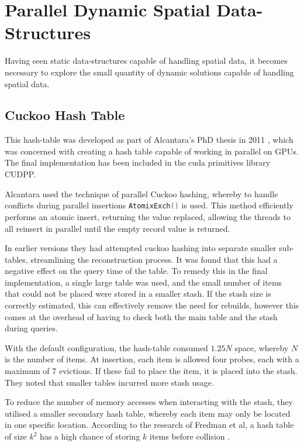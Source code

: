 \section{Parallel Dynamic Spatial Data-Structures\label{sec:parallel-dynamic-spatial}}
    
    Having seen static data-structures capable of handling spatial data, it becomes necessary to explore the small quantity of dynamic solutions capable of handling spatial data.
        
    \subsection{ Cuckoo Hash Table}
      This hash-table was developed as part of Alcantara's PhD thesis in 2011 \cite{Alc11,AS*09}, which was concerned with creating a hash table capable of working in parallel on GPUs. The final implementation has been included in the \gls{cuda} primitives library CUDPP.
      
      Alcantara used the technique of parallel Cuckoo hashing, whereby to handle conflicts during parallel insertions \lstinline[language={C++}]!AtomixExch()! is used. This method efficiently performs an \gls{atomic} insert, returning the value replaced, allowing the threads to all reinsert in parallel until the empty record value is returned. 
      
      In earlier versions they had attempted cuckoo hashing into separate smaller sub-tables, streamlining the reconstruction process. It was found that this had a negative effect on the query time of the table. To remedy this in the final implementation, a single large table was used, and the small number of items that could not be placed were stored in a smaller stash. If the stash size is correctly estimated, this can effectively remove the need for rebuilds, however this comes at the overhead of having to check both the main table and the stash during queries.
      
      With the default configuration, the hash-table consumed $1.25N$ space, whereby $N$ is the number of items. At insertion, each item is allowed four probes, each with a maximum of 7 evictions. If these fail to place the item, it is placed into the stash. They noted that smaller tables incurred more stash usage.
      
      To reduce the number of memory accesses when interacting with the stash, they utilised a smaller secondary hash table, whereby each item may only be located in one specific location. According to the research of Fredman et al, a hash table of size $k^{2}$ has a high chance of storing $k$ items before collision \cite{FKS84}.
      

